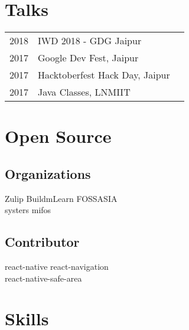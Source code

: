 \documentclass[a4paper]{deedy-resume} %
\begin{document}
\begin{minipage}[t]{0.33\textwidth}
\sectionspace %


\section{Talks}

\begin{tabular}{rll}
2018 & IWD 2018 - GDG Jaipur\\
2017 & Google Dev Fest, Jaipur\\
2017 & Hacktoberfest Hack Day, Jaipur\\
2017 & Java Classes, LNMIIT\\
\end{tabular}

\sectionspace %


\section{Open Source}
\subsection{Organizations}

Zulip \textbullet{} BuildmLearn  \textbullet{} FOSSASIA \\
systers \textbullet{} mifos \\

\sectionspace %

\subsection{Contributor}

\textbullet{} react-native
\textbullet{} react-navigation \\
\textbullet{} react-native-safe-area

\sectionspace %


\section{Skills}


\end{minipage}
\end{document}
